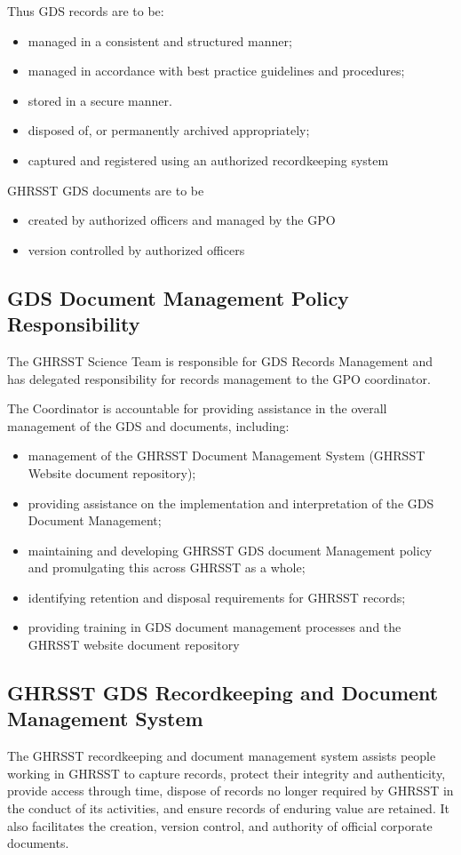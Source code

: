 Thus GDS records are to be: 
\begin{itemize}[noitemsep]
    \item managed in a consistent and structured manner;
    \item managed in accordance with best practice guidelines and procedures;
    \item stored in a secure manner.
    \item disposed of, or permanently archived appropriately;
    \item captured and registered using an authorized recordkeeping system
\end{itemize}
\newp

GHRSST GDS documents are to be
\begin{itemize}[noitemsep]
    \item created by authorized officers and managed by the GPO
    \item version controlled by authorized officers 
\end{itemize}

\subsection{GDS Document Management Policy Responsibility}
The GHRSST Science Team is responsible for GDS Records Management and has delegated responsibility for records management to the GPO coordinator.
\newp

The Coordinator is accountable for providing assistance in the overall management of the GDS and documents, including:
\begin{itemize}[noitemsep]
    \item  management of the GHRSST Document Management System (GHRSST Website document repository);
    \item providing assistance on the implementation and interpretation of the GDS Document Management;
    \item maintaining and developing GHRSST GDS document Management policy and promulgating this across GHRSST as a whole;
    \item identifying retention and disposal requirements for GHRSST records;
    \item providing training in GDS document management processes and the GHRSST website document repository
\end{itemize}

\subsection{GHRSST GDS Recordkeeping and Document
Management System}
The GHRSST recordkeeping and document management system assists people working in GHRSST
to capture records, protect their integrity and authenticity, provide access through time, dispose of
records no longer required by GHRSST in the conduct of its activities, and ensure records of enduring
value are retained. It also facilitates the creation, version control, and authority of official corporate
documents.
\newp

